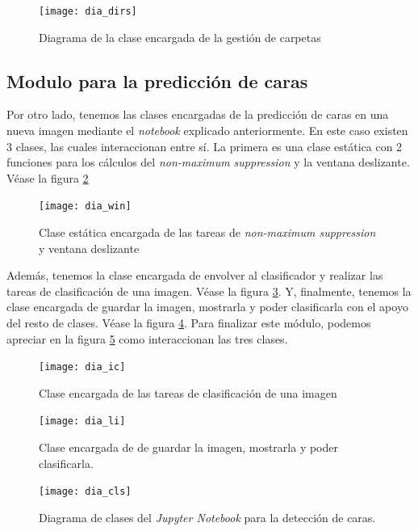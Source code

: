 \begin{figure}
\centering
\texttt{[image: dia\_dirs]}
\caption{Diagrama de la clase encargada de la gestión de carpetas}
\label{fig:C.4.2}
\end{figure}

\subsection{Modulo para la predicción de caras}

Por otro lado, tenemos las clases encargadas de la predicción de caras en una nueva imagen mediante el \textit{notebook} explicado anteriormente. En este caso existen 3 clases, las cuales interaccionan entre sí. La primera es una clase estática con 2 funciones para los cálculos del \textit{non-maximum suppression} y la ventana deslizante. Véase la figura \ref{fig:C.4.3} 


\begin{figure}
\centering
\texttt{[image: dia\_win]}
\caption[Clase estática encargada de varias tareas]{Clase estática encargada de las tareas de \textit{non-maximum suppression} y ventana deslizante}
\label{fig:C.4.3}
\end{figure}

Además, tenemos la clase encargada de envolver al clasificador y realizar las tareas de clasificación de una imagen. Véase la figura \ref{fig:C.4.4}. Y, finalmente, tenemos la clase encargada de guardar la imagen, mostrarla y poder clasificarla con el apoyo del resto de clases. Véase la figura \ref{fig:C.4.5}. Para finalizar este módulo, podemos apreciar en la figura \ref{fig:C.4.6} como interaccionan las tres clases.

\begin{figure}
\centering
\texttt{[image: dia\_ic]}
\caption{Clase encargada de las tareas de clasificación de una imagen}
\label{fig:C.4.4}
\end{figure}

\begin{figure}
\centering
\texttt{[image: dia\_li]}
\caption[Clases encargadas de la clasificación]{Clase encargada de de guardar la imagen, mostrarla y poder clasificarla.}
\label{fig:C.4.5}
\end{figure}

\begin{figure}
\centering
\texttt{[image: dia\_cls]}
\caption{Diagrama de clases del \textit{Jupyter Notebook} para la detección de caras.}
\label{fig:C.4.6}
\end{figure}

